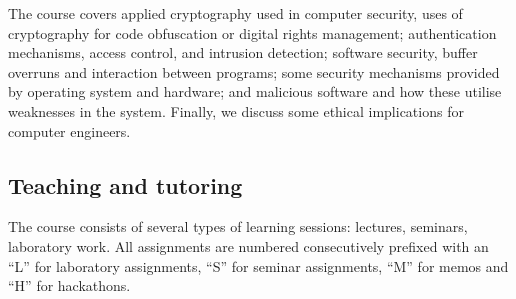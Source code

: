 The course covers
applied cryptography used in computer security, \eg uses of cryptography for 
code obfuscation or digital rights management;
authentication mechanisms, access control, and intrusion detection;
software security, \eg buffer overruns and interaction between programs;
some security mechanisms provided by operating system and hardware;
and malicious software and how these utilise weaknesses in the system.
Finally, we discuss some ethical implications for computer engineers.

\subsection{Teaching and tutoring}


The course consists of several types of learning sessions:
lectures, seminars, laboratory work.
All assignments are numbered consecutively prefixed with an \enquote{L} for 
laboratory assignments, \enquote{S} for seminar assignments, \enquote{M} for 
memos and \enquote{H} for hackathons.

